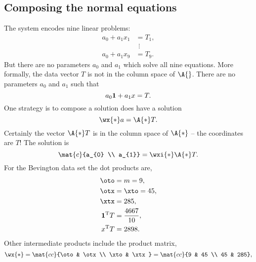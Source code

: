 \subsection{Composing the normal equations}  %
The system encodes nine linear problems:
  \begin{equation*}   %
   \begin{split}
    a_{0} + a_{1} x_{1} & = T_{1}, \\
     & \ \, \vdots \\
    a_{0} + a_{1} x_{9} & = T_{9}.
    \end{split}
  \end{equation*}
But there are no parameters $a_{0}$ and $a_{1}$ which solve all nine equations. More formally, the data vector $T$ is not in the column space of $\A{}$. There are no parameters $a_{0}$ and $a_{1}$ such that
  \begin{equation*}   %
    a_{0} {\bf{1}} + a_{1} x = T.
  \end{equation*}
One strategy is to compose a solution does have a solution
  \begin{equation*}   %
    \wx{*} a = \A{*} T.
  \end{equation*}
Certainly the vector $\A{*} T$ is in the column space of $\A{*}$ -- the coordinates are $T$! The solution is
  \begin{equation*}   %
    \mat{c}{a_{0} \\ a_{1}} = \wxi{*} \A{*}T.
  \end{equation*}
For the Bevington data set the dot products are,
  \begin{equation*}   %
  \begin{split}
    \oto &= m = 9, \\
    \otx &= \xto = 45, \\
    \xtx &= 285, \\
    {\bf{1}}^{\mathrm{T}}T &= \frac{4667}{10}, \\
    x^{\mathrm{T}}T        &= 2898.
  \end{split}
  \end{equation*}
Other intermediate products include the product matrix,
  \begin{equation*}   %
     \wx{*} = \mat{cc}{\oto & \otx \\ \xto & \xtx} = \mat{cc}{9 & 45 \\ 45 & 285},
  \end{equation*}
